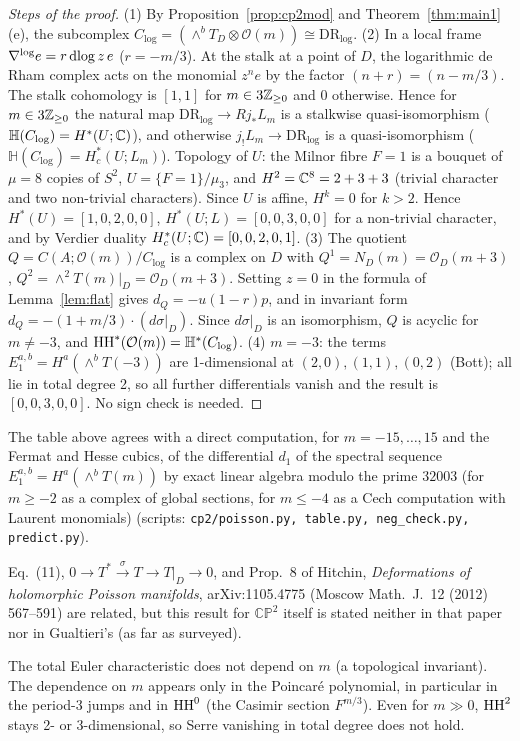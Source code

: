 \begin{proof}[Steps of the proof]
(1) By Proposition~\ref{prop:cp2mod} and Theorem~\ref{thm:main1}(e), the subcomplex $C_{\log}=(\wedge^bT_D\otimes\mathcal O(m))\cong\mathrm{DR}_{\log}$.
(2) In a local frame $\nabla^{\log}e=r\,\mathrm{dlog}\, z\,e$ ($r=-m/3$). At the stalk at a point of $D$, the logarithmic de Rham complex acts on the monomial $z^ne$ by the factor $(n+r)=(n-m/3)$. The stalk cohomology is $[1,1]$ for $m\in3\mathbb Z_{\ge0}$ and $0$ otherwise. Hence for $m\in3\mathbb Z_{\ge0}$ the natural map $\mathrm{DR}_{\log}\to Rj_*L_m$ is a stalkwise quasi-isomorphism ($\mathbb H(C_{\log})=H^*(U;\mathbb C)$), and otherwise $j_!L_m\to\mathrm{DR}_{\log}$ is a quasi-isomorphism ($\mathbb H(C_{\log})=H_c^*(U;L_m)$). Topology of $U$: the Milnor fibre $F=1$ is a bouquet of $\mu=8$ copies of $S^2$, $U=\{F=1\}/\mu_3$, and $H^2=\mathbb C^8=2+3+3$ (trivial character and two non-trivial characters). Since $U$ is affine, $H^k=0$ for $k>2$. Hence $H^*(U)=[1,0,2,0,0]$, $H^*(U;L)=[0,0,3,0,0]$ for a non-trivial character, and by Verdier duality $H^*_c(U;\mathbb C)=[0,0,2,0,1]$.
(3) The quotient $Q=C(A;\mathcal O(m))/C_{\log}$ is a complex on $D$ with $Q^1=N_D(m)=\mathcal O_D(m+3)$, $Q^2=\wedge^2T(m)|_D=\mathcal O_D(m+3)$. Setting $z=0$ in the formula of Lemma~\ref{lem:flat} gives $d_Q=-u(1-r)p$, and in invariant form $d_Q=-(1+m/3)\cdot(d\sigma|_D)$. Since $d\sigma|_D$ is an isomorphism, $Q$ is acyclic for $m\ne-3$, and $\mathrm{HH}^*(\mathcal O(m))=\mathbb H^*(C_{\log})$.
(4) $m=-3$: the terms $E_1^{a,b}=H^a(\wedge^bT(-3))$ are 1-dimensional at $(2,0),(1,1),(0,2)$ (Bott); all lie in total degree 2, so all further differentials vanish and the result is $[0,0,3,0,0]$. No sign check is needed.
\end{proof}
\begin{rem}[\tV]
The table above agrees with a direct computation, for $m=-15,\dots,15$ and the Fermat and Hesse cubics, of the differential $d_1$ of the spectral sequence $E_1^{a,b}=H^a(\wedge^bT(m))$ by exact linear algebra modulo the prime $32003$ (for $m\ge-2$ as a complex of global sections, for $m\le-4$ as a Cech computation with Laurent monomials) (scripts: \texttt{cp2/poisson.py, table.py, neg\_check.py, predict.py}).
\end{rem}
\begin{rem}
Eq.~(11), $0\to T^*\xrightarrow{\sigma}T\to T|_D\to0$, and Prop.~8 of Hitchin, \emph{Deformations of holomorphic Poisson manifolds}, arXiv:1105.4775 (Moscow Math.\ J.\ 12 (2012) 567--591) are related, but this result for $\mathbb{CP}^2$ itself is stated neither in that paper nor in Gualtieri's (as far as surveyed).
\end{rem}

\begin{obs}\tP
The total Euler characteristic does not depend on $m$ (a topological invariant). The dependence on $m$ appears only in the Poincar\'e polynomial, in particular in the period-3 jumps and in $\mathrm{HH}^0$ (the Casimir section $F^{m/3}$). Even for $m\gg0$, $\mathrm{HH}^2$ stays 2- or 3-dimensional, so Serre vanishing in total degree does not hold.
\end{obs}

